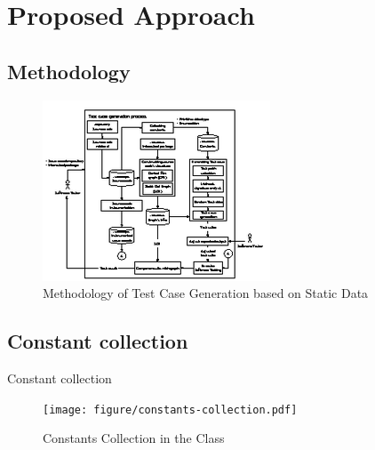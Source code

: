 \documentclass{beamer}
\begin{document}

%
\section{Proposed Approach}
\subsection{Methodology}
\begin{frame}
    \begin{figure}
        \includegraphics[height=0.8\paperheight]{figure/Methodology.eps}
        \caption{Methodology of Test Case Generation based on Static Data}
        \label{fig:methodologyOverview}
    \end{figure}
\end{frame}


\subsection{Constant collection}
\begin{frame}{Constant collection}
    \begin{figure}
        \texttt{[image: figure/constants-collection.pdf]}
        \caption{Constants Collection in the Class}
        \label{fig:constantsCollection}
    \end{figure}
\end{frame}
\end{document}
